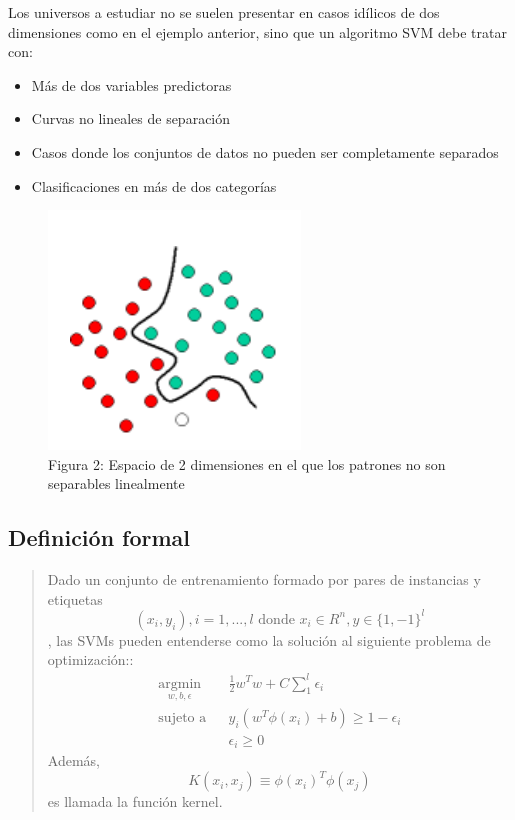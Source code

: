 \documentclass[11pt]{article}
\makeatletter
\def\maxwidth{\ifdim\Gin@nat@width>\linewidth\linewidth
    \else\Gin@nat@width\fi}
\let\Oldincludegraphics\includegraphics
\renewcommand{\includegraphics}[1]{\Oldincludegraphics[width=.8\maxwidth]{#1}}
\providecommand{\tightlist}{%
      \setlength{\itemsep}{0pt}\setlength{\parskip}{0pt}}
\makeatother
\begin{document}
Los universos a estudiar no se suelen presentar en casos idílicos de dos
dimensiones como en el ejemplo anterior, sino que un algoritmo SVM debe
tratar con:

\begin{itemize}
\tightlist
\item
  Más de dos variables predictoras
\item
  Curvas no lineales de separación
\item
  Casos donde los conjuntos de datos no pueden ser completamente
  separados
\item
  Clasificaciones en más de dos categorías
\end{itemize}

\begin{figure}
\centering
\includegraphics{no-separable-linealmente.PNG}
\caption{Figura 2: Espacio de 2 dimensiones en el que los patrones no
son separables linealmente}
\end{figure}

\subsection{Definición formal}\label{definiciuxf3n-formal}

\begin{quote}
Dado un conjunto de entrenamiento formado por pares de instancias y
etiquetas
\[(x_i,y_i),  i=1, . . . , l \text{ donde } x_i \in R^n, y \in \{1, −1\}^l\]
, las SVMs pueden entenderse como la solución al siguiente problema de
optimización:: \[
\begin{aligned}
\underset{w,b,\epsilon}{\operatorname{argmin}} & & \frac{1}{2}w^Tw + C
\sum_1^l{\epsilon_i} \\
\text{sujeto a} & & y_i(w^T \phi(x_i) + b) \ge 1- \epsilon_i \\
& & \epsilon_i \ge 0
\end{aligned}
\] Además, \[K(x_i, x_j ) ≡ \phi(x_i)^T \phi(x_j)\] es llamada la
función kernel.
\end{quote}
\end{document}
